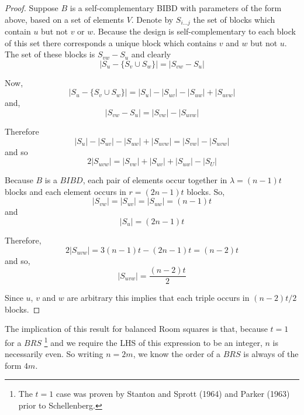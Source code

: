 \documentclass[11pt, a4paper]{book}\usepackage[]{graphicx}\usepackage[]{xcolor}
\begin{document}
\begin{proof}
Suppose $B$ is a self-complementary BIBD with parameters
of the form above, based on a set of elements $V$. Denote
by $S_{i\ldots j}$ the set of blocks which contain $u$ but
not $v$ or $w$. Because the design is self-complementary to
each block of this set there corresponds a unique block
which contains $v$ and $w$ but not $u$. The set of these
blocks is $S_{vw} - S_u$ and clearly
\begin{equation}
|S_u - \{S_v \cup S_w\}| = |S_{vw} - S_u|
\end{equation}

Now,
\begin{equation}
|S_u-\{S_v \cup S_w\}| = |S_u| - |S_{uv}| -|S_{uw}| + |S_{uvw}|
\end{equation}
and,
\begin{equation}
|S_{vw} - S_u| = |S_{vw}| - |S_{uvw}|
\end{equation}

Therefore
\begin{equation}
|S_u| - |S_{uv}| -|S_{uw}| + |S_{uvw}| = |S_{vw}| - |S_{uvw}|
\end{equation}
and so
\begin{equation}
2|S_{uvw}| = |S_{vw}| + |S_{uv}| + |S_{uw}| - |S_{U}|
\end{equation}

Because $B$ is a $BIBD$, each pair of elements occur
together in $\lambda = (n - 1)t$ blocks and each element
occurs in $r  =(2n - 1)t$ blocks. So,
\begin{equation}
|S_{vw}| = |S_{uv}| = |S_{uw}| = (n - 1)t
\end{equation}
and
\begin{equation}
|S_u| = (2n - 1)t
\end{equation}

Therefore,
\begin{equation}
2|S_{uvw}| = 3(n - 1)t - (2n  -1)t = (n - 2)t
\end{equation}
and so,
\begin{equation}
|S_{uvw}| = \frac{(n - 2)t}{2}
\end{equation}

Since $u$, $v$ and $w$ are arbitrary this implies that each
triple occurs in $(n - 2)t/2$ blocks.
\end{proof}

The implication of this result for balanced Room squares is
that, because $t = 1$ for a $BRS$
\footnote{The $t=1$ case was proven by Stanton and Sprott (1964) and Parker
    (1963) prior to Schellenberg.}
and we require the LHS
of this expression to be an integer, $n$ is necessarily
even. So writing $n = 2m$, we know the order of a $BRS$ is
always of the form $4m$.
\end{document}

